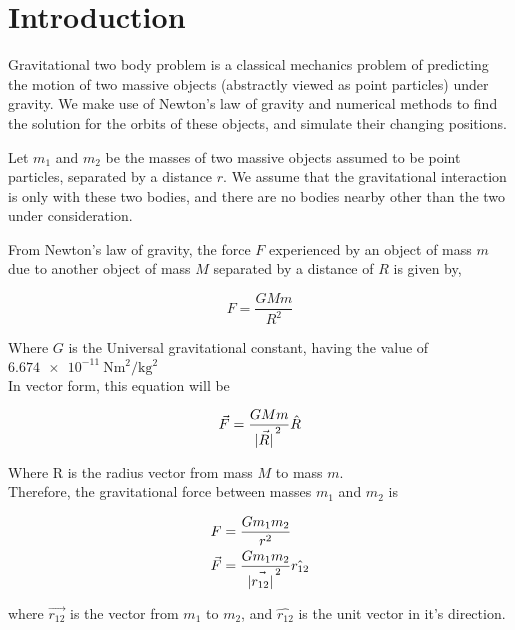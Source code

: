 \section{Introduction}

Gravitational two body problem is a classical mechanics problem of predicting the motion of two massive objects (abstractly viewed as point particles) under gravity. We make use of Newton's law of gravity and numerical methods to find the solution for the orbits of these objects, and simulate their changing positions.

Let $m_1$ and $m_2$ be the masses of two massive objects assumed to be point particles, separated by a distance $r$. We assume that the gravitational interaction is only with these two bodies, and there are no bodies nearby other than the two under consideration.

From Newton's law of gravity, the force $F$ experienced by an object of mass $m$ due to another object of mass $M$ separated by a distance of $R$ is given by,

\begin{equation}
    F = \frac{G M m}{R^2}
\end{equation}

Where $G$ is the Universal gravitational constant, having the value of
$\SI{6.674e-11}{\newton \metre^2 \per \kg ^2}$\\

In vector form, this equation will be

\begin{equation}
    \vec{F} = \frac{G M m}{\vec{\abs{R}}^{\, 2}} \hat{R}
\end{equation}

Where R is the radius vector from mass $M$ to mass $m$.\\

Therefore, the gravitational force between masses $m_1$ and $m_2$ is

\begin{equation}\label{force_eqn}
    \begin{split}
        F &= \frac{G m_1 m_2}{r^2}\\
        \vec{F} &= \frac{G m_1 m_2}{\vec{\abs{r_{12}}}^{\, 2}} \hat{r_{12}}
    \end{split}
\end{equation}

where $\vec{r_{12}}$ is the vector from $m_1$ to $m_2$, and $\hat{r_{12}}$ is the unit vector in it's direction.\\

